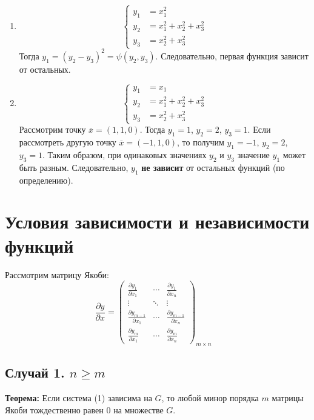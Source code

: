 \documentclass{article}
\begin{document}
\begin{enumerate}
    \item
    \[
    \left\{
    \begin{aligned}
    y_1 &= x_1^2 \\
    y_2 &= x_1^2 + x_2^2 + x_3^2 \\
    y_3 &= x_2^2 + x_3^2
    \end{aligned}
    \right.
    \]
    Тогда $y_1 = (y_2 - y_3)^2 = \psi(y_2, y_3)$. Следовательно, первая функция зависит от остальных.

    \item
    \[
    \left\{
    \begin{aligned}
    y_1 &= x_1 \\
    y_2 &= x_1^2 + x_2^2 + x_3^2 \\
    y_3 &= x_2^2 + x_3^2
    \end{aligned}
    \right.
    \]
    Рассмотрим точку $\bar{x} = (1, 1, 0)$. Тогда $y_1=1$, $y_2=2$, $y_3=1$. Если рассмотреть другую точку $\bar{x} = (-1, 1, 0)$, то получим $y_1=-1$, $y_2=2$, $y_3=1$. Таким образом, при одинаковых значениях $y_2$ и $y_3$ значение $y_1$ может быть разным. Следовательно, $y_1$ \textbf{не зависит} от остальных функций (по определению).
\end{enumerate}

\section*{Условия зависимости и независимости функций}

Рассмотрим матрицу Якоби:
\[
\frac{\partial y}{\partial x} =
\begin{pmatrix}
\frac{\partial y_1}{\partial x_1} & \cdots & \frac{\partial y_1}{\partial x_n} \\
\vdots & \ddots & \vdots \\
\frac{\partial y_{m-1}}{\partial x_1} & \cdots & \frac{\partial y_{m-1}}{\partial x_n} \\
\frac{\partial y_m}{\partial x_1} & \cdots & \frac{\partial y_m}{\partial x_n}
\end{pmatrix}_{m \times n}
\quad
\]

\subsection*{Случай 1. $n \geq m$}

\textbf{Теорема:} Если система (1) зависима на $G$, то любой минор порядка $m$ матрицы Якоби тождественно равен 0 на множестве $G$.
\end{document}
